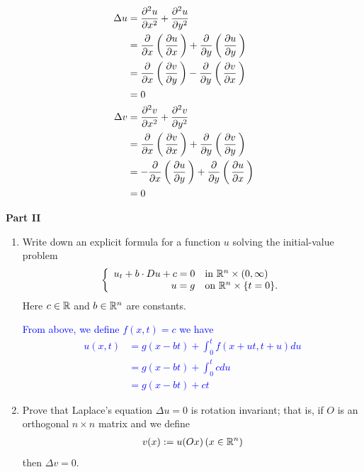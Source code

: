 \documentclass[10pt,a4paper]{report}
\newcommand{\BLUE}[1]{\textcolor{blue}{#1}}
\begin{document}
\begin{description}
\begin{enumerate}
		\BLUE{
		\begin{align*}
			\Delta u &= \frac{\partial^2 u}{\partial x^2}+ \frac{\partial^2 u}{\partial y^2} \\
			&= \frac{\partial }{\partial x}\left (\, \frac{\partial u}{\partial x} \,\right )+\frac{\partial }{\partial y}\left (\, \frac{\partial u}{\partial y} \,\right ) \\
			&= \frac{\partial }{\partial x}\left (\, \frac{\partial v}{\partial y} \,\right )-\frac{\partial }{\partial y}\left (\, \frac{\partial v}{\partial x} \,\right )\\
			&= 0 \\
			\Delta v &= \frac{\partial^2 v}{\partial x^2}+ \frac{\partial^2 v}{\partial y^2} \\
			&= \frac{\partial }{\partial x}\left (\, \frac{\partial v}{\partial x} \,\right )+\frac{\partial }{\partial y}\left (\, \frac{\partial v}{\partial y} \,\right ) \\
			&= -\frac{\partial }{\partial x}\left (\, \frac{\partial u}{\partial y} \,\right )+\frac{\partial }{\partial y}\left (\, \frac{\partial u}{\partial x} \,\right )\\
			&= 0 
		\end{align*}
		}
		
	\end{enumerate}
	
	\item \textbf{Part II}
\newcommand{\SECPART}[2]{\frac{\partial^2 #1}{\partial^2 #2}}
	\begin{enumerate}
		\item Write down an explicit formula for a function $u$ solving the initial-value problem
		\begin{align*}
			\left \{ \begin{array}{rl}
				u_t+b\cdot Du+c=0 & \text{in } \mathbb{R}^n\times (0,\infty)\\
				u=g & \text{on } \mathbb{R}^n\times \{t=0\}.
			\end{array}
			 \right .
		\end{align*}Here $c \in \mathbb{R}$ and $b\in\mathbb{R}^n$ are constants.
		
		\BLUE{From above, we define $f(x,t) = c$ we have
		\begin{align*}
			u(x,t) &= g(x-bt)+\int_{0}^t f(x+ut, t+u) du \\
			&= g(x-bt)+\int_{0}^t c du \\
			&= g(x-bt)+ ct
\end{align*}		
		}
		
		\item Prove that Laplace's equation $\Delta u=0$ is rotation invariant; that is, if $O$ is an orthogonal $n \times n$ matrix and we define
		\begin{align*}
			v(x) := u(Ox) \, (x \in \mathbb{R}^n)
		\end{align*}then $\Delta v=0$.
		

\end{enumerate}
\end{description}
\end{document}
